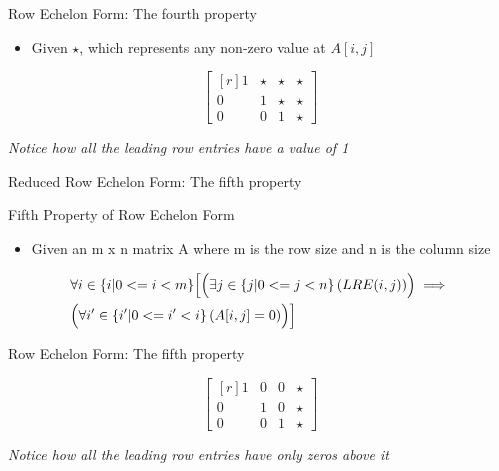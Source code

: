 \documentclass{beamer}
\begin{document}
\begin{frame}{Row Echelon Form: The fourth property}
  \begin{example}
    \begin{itemize}
      \item Given $\star$, which represents any non-zero value at $A[i, j]$
    \end{itemize}
    \begin{equation}
      \begin{bmatrix*}[r]
        1 & \star & \star & \star \\
        0 & 1 & \star & \star \\
        0 & 0 & 1 & \star 
      \end{bmatrix*}
    \end{equation}

    \textit{Notice how all the leading row entries have a value of 1}
  \end{example}
\end{frame}

\begin{frame}{Reduced Row Echelon Form: The fifth property}
  \begin{block}{Fifth Property of Row Echelon Form}
    \begin{itemize}
    \item Given an m x n matrix A where m is the row size and n is the column size
    \end{itemize}
    \begin{equation}
      \begin{split}
        &\forall i \in \{i | 0 <= i < m \} \Bigl[ \Bigl( \exists j \in \{j | 0 <= j < n \} \left( LRE(i, j) \right) \Bigr)  \implies \Bigr. \\
        &\Bigl. \Bigl(\forall i^{\prime} \in \{ i^{\prime} | 0 <= i^{\prime} < i \} \left( A[i, j] = 0 \right) \Bigr) \Bigr]
      \end{split}
    \end{equation}
  \end{block}
\end{frame}

\begin{frame}{Row Echelon Form: The fifth property}
  \begin{example}
    \begin{equation}
      \begin{bmatrix*}[r]
        1 & 0 & 0 & \star \\
        0 & 1 & 0 & \star \\
        0 & 0 & 1 & \star 
      \end{bmatrix*}
    \end{equation}

    \textit{Notice how all the leading row entries have only zeros above it}
  \end{example}
\end{frame}
\end{document}
